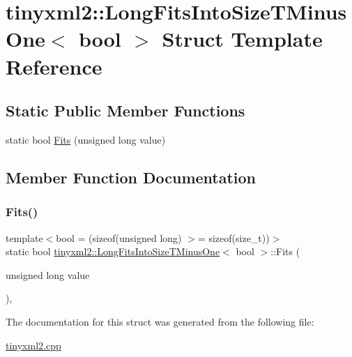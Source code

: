 \hypertarget{structtinyxml2_1_1_long_fits_into_size_t_minus_one}{}\section{tinyxml2\+:\+:Long\+Fits\+Into\+Size\+T\+Minus\+One$<$ bool $>$ Struct Template Reference}
\label{structtinyxml2_1_1_long_fits_into_size_t_minus_one}
\subsection*{Static Public Member Functions}
\begin{DoxyCompactItemize}
\item 
static bool \hyperlink{structtinyxml2_1_1_long_fits_into_size_t_minus_one_a3057710104ab733963eb32fda0bc374c}{Fits} (unsigned long value)
\end{DoxyCompactItemize}


\subsection{Member Function Documentation}
\mbox{\label{structtinyxml2_1_1_long_fits_into_size_t_minus_one_a3057710104ab733963eb32fda0bc374c}} 
\subsubsection{\texorpdfstring{Fits()}{Fits()}}
{\footnotesize\ttfamily template$<$bool  = (sizeof(unsigned long) $>$= sizeof(size\+\_\+t))$>$ \\
static bool \hyperlink{structtinyxml2_1_1_long_fits_into_size_t_minus_one}{tinyxml2\+::\+Long\+Fits\+Into\+Size\+T\+Minus\+One}$<$ bool $>$\+::Fits (\begin{DoxyParamCaption}\item[{unsigned long}]{value }\end{DoxyParamCaption})\hspace{0.3cm}{\ttfamily [inline]}, {\ttfamily [static]}}



The documentation for this struct was generated from the following file\+:\begin{DoxyCompactItemize}
\item 
\hyperlink{tinyxml2_8cpp}{tinyxml2.\+cpp}\end{DoxyCompactItemize}
